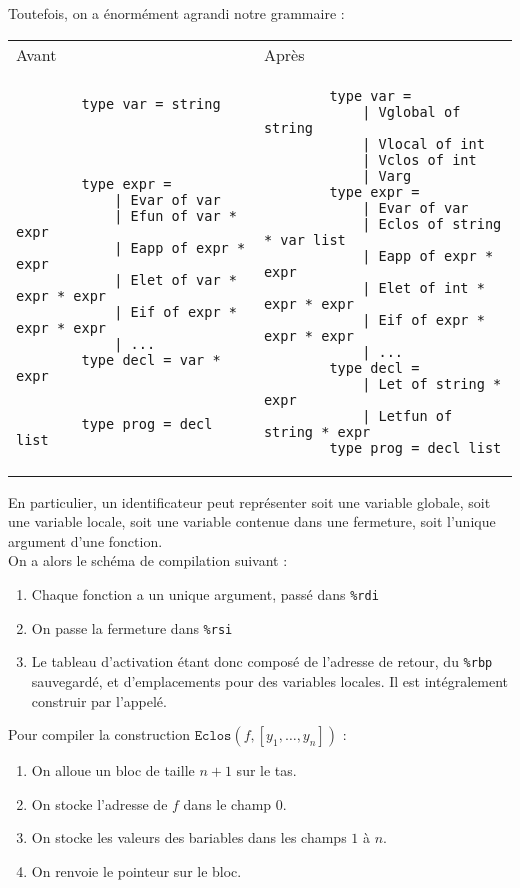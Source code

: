 \documentclass{cours}
\begin{document}
Toutefois, on a énormément agrandi notre grammaire : \\
\begin{tabular}{p{}p{}}
    Avant & Après \\
    \begin{verbatim}
        type var = string




        type expr =
            | Evar of var
            | Efun of var * expr
            | Eapp of expr * expr
            | Elet of var * expr * expr
            | Eif of expr * expr * expr
            | ...
        type decl = var * expr


        type prog = decl list
    \end{verbatim} 
    & 
    \begin{verbatim}
        type var =
            | Vglobal of string
            | Vlocal of int
            | Vclos of int
            | Varg
        type expr =
            | Evar of var
            | Eclos of string * var list
            | Eapp of expr * expr
            | Elet of int * expr * expr
            | Eif of expr * expr * expr
            | ...
        type decl =
            | Let of string * expr
            | Letfun of string * expr
        type prog = decl list
    \end{verbatim}
\end{tabular}

En particulier, un identificateur peut représenter soit une variable globale, soit une variable locale, soit une variable contenue dans une fermeture, soit l'unique argument d'une fonction.\\
On a alors le schéma de compilation suivant : 
\begin{enumerate}
    \item Chaque fonction a un unique argument, passé dans \texttt{\%rdi}
    \item On passe la fermeture dans \texttt{\%rsi}
    \item Le tableau d'activation étant donc composé de l'adresse de retour, du \texttt{\%rbp} sauvegardé, et d'emplacements pour des variables locales. Il est intégralement construir par l'appelé. 
\end{enumerate}

Pour compiler la construction $\texttt{Eclos}(f, [y_{1}, \ldots, y_{n}])$ :
\begin{enumerate}
    \item On alloue un bloc de taille $n + 1$ sur le tas.
    \item On stocke l'adresse de $f$ dans le champ $0$.
    \item On stocke les valeurs des bariables dans les champs $1$ à $n$.
    \item On renvoie le pointeur sur le bloc. 
\end{enumerate}
\end{document}
